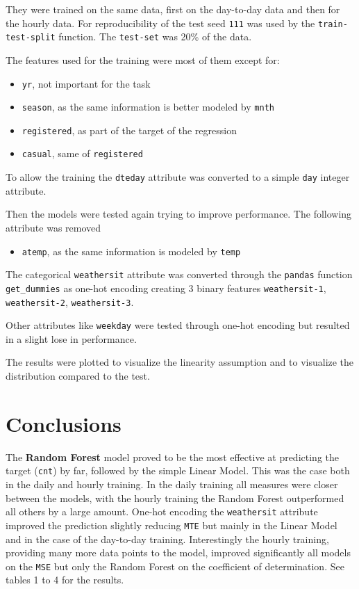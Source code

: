 \documentclass[11pt]{article}
\begin{document}
They were trained on the same data, first on the day-to-day data and then for the hourly data.
For reproducibility of the test seed \texttt{111} was used by the \texttt{train-test-split} function. The \texttt{test-set} was 20\% of the data.

The features used for the training were most of them except for:
\begin{itemize}
\item \texttt{yr}, not important for the task
\item \texttt{season}, as the same information is better modeled by \texttt{mnth}
\item \texttt{registered}, as part of the target of the regression
\item \texttt{casual}, same of \texttt{registered}
\end{itemize}

To allow the training the \texttt{dteday} attribute was converted to a simple \texttt{day} integer attribute.

Then the models were tested again trying to improve performance.
The following attribute was removed
\begin{itemize}
\item \texttt{atemp}, as the same information is modeled by \texttt{temp}
\end{itemize}

The categorical \texttt{weathersit} attribute was converted through the \texttt{pandas} function \texttt{get\_dummies} as one-hot encoding creating 3 binary features \texttt{weathersit-1}, \texttt{weathersit-2}, \texttt{weathersit-3}.

Other attributes like \texttt{weekday} were tested through one-hot encoding but resulted in a slight lose in performance.

The results were plotted to visualize the linearity assumption and to visualize the distribution compared to the test.
\section{Conclusions}
\label{sec:org0dca537}
The \textbf{Random Forest} model proved to be the most effective at predicting the target (\texttt{cnt}) by far, followed by the simple Linear Model. This was the case both in the daily and hourly training.
In the daily training all measures were closer between the models, with the hourly training the Random Forest outperformed all others by a large amount.
One-hot encoding the \texttt{weathersit} attribute improved the prediction slightly reducing \texttt{MTE} but mainly in the Linear Model and in the case of the day-to-day training.
Interestingly the hourly training, providing many more data points to the model, improved significantly all models on the \texttt{MSE} but only the Random Forest on the coefficient of determination.
See tables 1 to 4 for the results.
\end{document}
